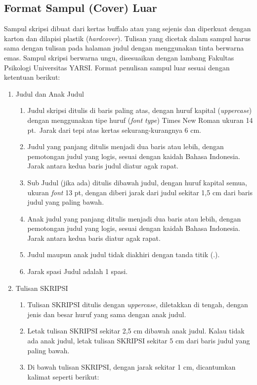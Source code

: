 \documentclass[
  indonesian,
  letterpaper,
]{scrbook}
\providecommand{\tightlist}{%
  \setlength{\itemsep}{0pt}\setlength{\parskip}{0pt}}
\begin{document}
\subsection{Format Sampul (Cover) Luar}\label{format-sampul-cover-luar}

Sampul skripsi dibuat dari kertas buffalo atau yang sejenis dan
diperkuat dengan karton dan dilapisi plastik (\emph{hardcover}). Tulisan
yang dicetak dalam sampul harus sama dengan tulisan pada halaman judul
dengan menggunakan tinta berwarna emas. Sampul skripsi berwarna ungu,
disesuaikan dengan lambang Fakultas Psikologi Universitas YARSI. Format
penulisan sampul luar sesuai dengan ketentuan berikut:

\begin{enumerate}
\def\labelenumi{\arabic{enumi}.}
\item
  Judul dan Anak Judul

  \begin{enumerate}
  \def\labelenumii{\alph{enumii}.}
  \tightlist
  \item
    Judul skripsi ditulis di baris paling atas, dengan huruf kapital
    (\emph{uppercase}) dengan menggunakan tipe huruf (\emph{font type})
    Times New Roman ukuran 14 pt.~Jarak dari tepi atas kertas
    sekurang-kurangnya 6 cm.
  \item
    Judul yang panjang ditulis menjadi dua baris atau lebih, dengan
    pemotongan judul yang logis, sesuai dengan kaidah Bahasa Indonesia.
    Jarak antara kedua baris judul diatur agak rapat.
  \item
    Sub Judul (jika ada) ditulis dibawah judul, dengan huruf kapital
    semua, ukuran \emph{font} 13 pt, dengan diberi jarak dari judul
    sekitar 1,5 cm dari baris judul yang paling bawah.
  \item
    Anak judul yang panjang ditulis menjadi dua baris atau lebih, dengan
    pemotongan judul yang logis, sesuai dengan kaidah Bahasa Indonesia.
    Jarak antara kedua baris diatur agak rapat.
  \item
    Judul maupun anak judul tidak diakhiri dengan tanda titik (.).
  \item
    Jarak spasi Judul adalah 1 spasi.
  \end{enumerate}
\item
  Tulisan SKRIPSI

  \begin{enumerate}
  \def\labelenumii{\alph{enumii}.}
  \item
    Tulisan SKRIPSI ditulis dengan \emph{uppercase}, diletakkan di
    tengah, dengan jenis dan besar huruf yang sama dengan anak judul.
  \item
    Letak tulisan SKRIPSI sekitar 2,5 cm dibawah anak judul. Kalau tidak
    ada anak judul, letak tulisan SKRIPSI sekitar 5 cm dari baris judul
    yang paling bawah.
  \item
    Di bawah tulisan SKRIPSI, dengan jarak sekitar 1 cm, dicantumkan
    kalimat seperti berikut:


\end{enumerate}
\end{enumerate}
\end{document}
